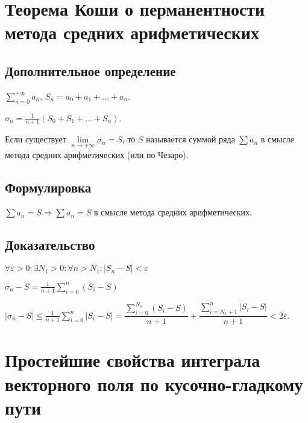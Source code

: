 \documentclass{article}
\begin{document}
    \newpage
    
    \section{Теорема Коши о перманентности метода средних арифметических}
        
        \subsection{Дополнительное определение}
        
            $\sum\limits^{+\infty}_{n = 0} a_n$, $S_n = a_0 + a_1 + \ldots + a_n$.
            
            $\sigma_n = \frac{1}{n + 1} \left( S_0 + S_1 + \ldots + S_n \right)$.
            
            Если существует $\lim\limits_{n \rightarrow +\infty} \sigma_n = S$, то $S$ называется суммой ряда $\sum a_n$ в смысле метода средних арифметических (или по Чезаро).
        
        \subsection{Формулировка}
        
            $\sum a_n = S \Rightarrow \sum a_n = S$ в смысле метода средних арифметических.
        
        \subsection{Доказательство}
        
            $\forall \varepsilon > 0 : \exists N_1 > 0 : \forall n > N_1 : \left| S_n - S \right| < \varepsilon$
            
            $\sigma_n - S = \frac{1}{n + 1} \sum\limits^n_{i = 0} \left( S_i - S \right)$ 
            
            $\left| \sigma_n - S \right| \leqslant \frac{1}{n + 1} \sum\limits^n_{i = 0} \left| S_i - S \right| = \dfrac{\sum\limits^{N_1}_{i = 0} \left( S_i - S \right)}{n + 1} + \dfrac{\sum\limits^n_{i = N_1 + 1} \left| S_i - S \right|}{n + 1} < 2 \varepsilon$.
            
    \newpage
    
    \section{Простейшие свойства интеграла векторного поля по кусочно-гладкому пути}
    
\end{document}
